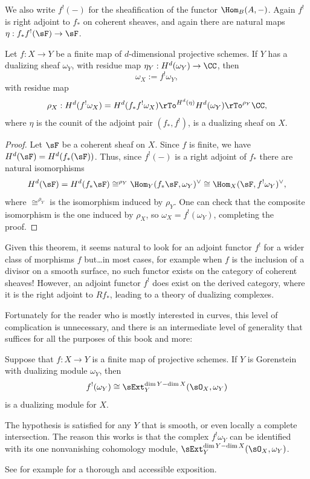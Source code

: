 We also write  $f^{!}(-)$ for the sheafification of  the functor 
$\Hom_{B}(A,-)$. Again $f^{!}$ is right adjoint to $f_{*}$ on coherent sheaves,
and again there are natural maps $\eta:f_{*}f^{!}(\sF) \to\sF$. 

\begin{theorem}\label{canonical as Hom}
Let $f: X \to Y$ be a finite map of $d$-dimensional projective schemes. If $Y$ has a dualizing sheaf $\omega_{Y}$,
with residue map $\eta_{Y}: H^{d}(\omega_{Y}) \to \CC$,
then 
 $$
\omega_{X} := f^{!}\omega_{Y},
$$
with residue map 
$$
\rho_{X}: H^{d}(f^{!}\omega_{X}) = H^{d}(f_{*}f^{!}\omega_{X}) \rTo^{H^{d}(\eta)} H^{d}(\omega_{Y}) \rTo^{\rho_{Y}} \CC,
$$ 
where $\eta$ is the counit of the adjoint pair $(f_{*},f^{!})$, is a dualizing sheaf on $X$. 
\end{theorem}

\begin{proof}
Let $\sF$ be a coherent sheaf on $X$. Since $f$ is finite, we have $H^{d}(\sF) = H^{d}(f_{*}(\sF))$. Thus,
since $f^{!}(-)$ is a right adjoint of $f_{*}$ there are natural isomorphisms
$$
H^{d}(\sF) = H^{d}(f_{*}\sF) \cong^{\rho_{Y}} \Hom_{Y}(f_{*}\sF, \omega_{Y})^{\vee} \cong 
\Hom_{X}(\sF, f^{!}\omega_{Y})^{\vee},
$$
where $\cong^{\rho_{Y}}$ is the isomorphism induced by $\rho_{Y}$. One can check that the composite
isomorphism is the one induced by $\rho_{X}$, so $\omega_X = f^{!}(\omega_{Y})$, completing the proof.\end{proof}

\begin{fact}
 Given this theorem, it seems natural to look for an adjoint functor $f^{!}$ for a wider class of morphisms
$f$ but\dots in most cases, for example when $f$ is the inclusion of a divisor on a smooth surface, no such functor exists on the category of coherent sheaves! However, an adjoint functor
$f^{!}$ does exist on the derived category, where it is the right adjoint to $Rf_{*}$, leading to a theory
of dualizing complexes. 

Fortunately for the reader who is mostly interested in curves, this level of 
complication is unnecessary, and there is an intermediate level of generality that suffices
for all the purposes of this book and more: 

\begin{theorem}\label{general adjunction}
Suppose that $f: X\to Y$ is a finite map of projective schemes. If $Y$ is
Gorenstein with dualizing module $\omega_{Y}$, then
$$
f^{!}(\omega_{Y}) \cong \sExt^{\dim Y-\dim X}_{Y}(\sO_{X}, \omega_{Y})
$$
is a dualizing module for $X$.
\end{theorem}

The hypothesis is satisfied for any $Y$ that is smooth, or even locally a complete intersection. The
reason this works is that the complex
$f^{!} \omega_{Y}$ 
can be identified with its one nonvanishing cohomology module,
 $\sExt^{\dim Y-\dim X}_{Y}(\sO_{X}, \omega_{Y})$. 

See for example \cite{AltmanKleiman} for a thorough and accessible exposition.\end{fact}

